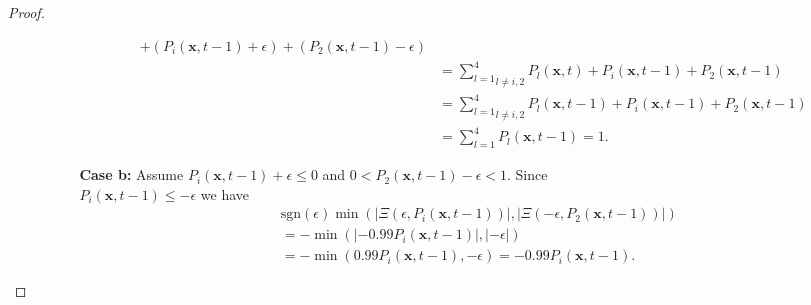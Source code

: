\documentclass[\main/thesis.tex]{subfiles}
\begin{document}
\begin{proof}
\begin{itemize}
\begin{itemize}
\begin{itemize}
\begin{align*}
                           	                           {+} (P_i(\boldsymbol{x}, t{-}1) {+} \epsilon)
                           	                           {+} (P_2(\boldsymbol{x}, t{-}1) {-} \epsilon) \\
                           	                          &{=} \underset{l {\ne} i, 2}{\sum_{l{=}1}^4} P_l(\boldsymbol{x}, t)
                           	                           {+} P_i(\boldsymbol{x}, t{-}1) {+} P_2(\boldsymbol{x}, t{-}1) \\
                           	                          &{=} \underset{l {\ne} i, 2}{\sum_{l{=}1}^4} P_l(\boldsymbol{x},t{-}1) 
                           	                           {+} P_i(\boldsymbol{x}, t{-}1) {+} P_2(\boldsymbol{x}, t{-}1) \\
                           	                          &{=} \sum_{l{=}1}^4 P_l(\boldsymbol{x}, t{-}1) {=} 1.
                           	                        \end{align*}
                               \item[{\bf Case b:}] Assume $P_i(\boldsymbol{x}, t{-}1) {+} \epsilon {\le} 0$ 
                           	                        and $0 {<} P_2(\boldsymbol{x}, t{-}1) {-} \epsilon {<} 1$. Since\\
                           	                        $P_i(\boldsymbol{x}, t{-}1) {\le} {-}\epsilon$ we have 
                           	                        \begin{align*}
                           	                          &\text{sgn}(\epsilon) \min(|\Xi(\epsilon, P_i(\boldsymbol{x},t{-}1))|, 
                           	                                                     |\Xi({-}\epsilon, 
                           	                                                          P_2(\boldsymbol{x},t{-}1))|)
                           	                          \\ 
                           	                          &{=} {-} \min(|{-}0.99 P_i(\boldsymbol{x}, t{-}1)|, |{-}\epsilon|) \\
                           	                          &{=} {-} \min(0.99 P_i(\boldsymbol{x}, t{-}1), {-}\epsilon) 
                           	                           {=} {-} 0.99 P_i(\boldsymbol{x}, t{-}1).
                           	                          \tag{4}
                           	                          \label{eq:incr1Ab}
                           	                        \end{align*}

\end{itemize}
\end{itemize}
\end{itemize}
\end{proof}
\end{document}
